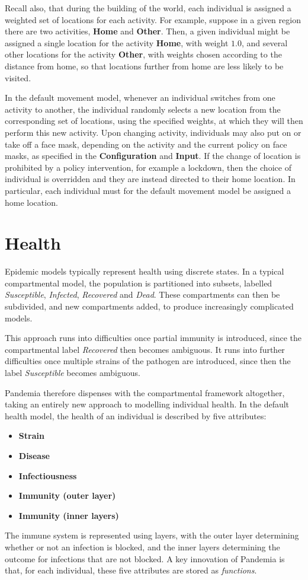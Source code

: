 \documentclass[10pt,letterpaper]{article}
\begin{document}
Recall also, that during the building of the world, each individual is assigned a weighted set of locations for each activity. For example, suppose in a given region there are two activities, \textbf{Home} and \textbf{Other}. Then, a given individual might be assigned a single location for the activity \textbf{Home}, with weight $1.0$, and several other locations for the activity \textbf{Other}, with weights chosen according to the distance from home, so that locations further from home are less likely to be visited.

In the default movement model, whenever an individual switches from one activity to another, the individual randomly selects a new location from the corresponding set of locations, using the specified weights, at which they will then perform this new activity. Upon changing activity, individuals may also put on or take off a face mask, depending on the activity and the current policy on face masks, as specified in the \textbf{Configuration} and \textbf{Input}. If the change of location is prohibited by a policy intervention, for example a lockdown, then the choice of individual is overridden and they are instead directed to their home location. In particular, each individual must for the default movement model be assigned a home location.

\section{Health}
Epidemic models typically represent health using discrete states. In a typical compartmental model, the population is partitioned into subsets, labelled \textit{Susceptible}, \textit{Infected}, \textit{Recovered} and \textit{Dead}. These compartments can then be subdivided, and new compartments added, to produce increasingly complicated models.

This approach runs into difficulties once partial immunity is introduced, since the compartmental label \textit{Recovered} then becomes ambiguous. It runs into further difficulties once multiple strains of the pathogen are introduced, since then the label \textit{Susceptible} becomes ambiguous.

Pandemia therefore dispenses with the compartmental framework altogether, taking an entirely new approach to modelling individual health. In the default health model, the health of an individual is described by five attributes:
\begin{itemize}
\item \textbf{Strain}
\item \textbf{Disease}
\item \textbf{Infectiousness}
\item \textbf{Immunity (outer layer)}
\item \textbf{Immunity (inner layers)}
\end{itemize}
The immune system is represented using layers, with the outer layer determining whether or not an infection is blocked, and the inner layers determining the outcome for infections that are not blocked. A key innovation of Pandemia is that, for each individual, these five attributes are stored as \textit{functions}.
\end{document}
